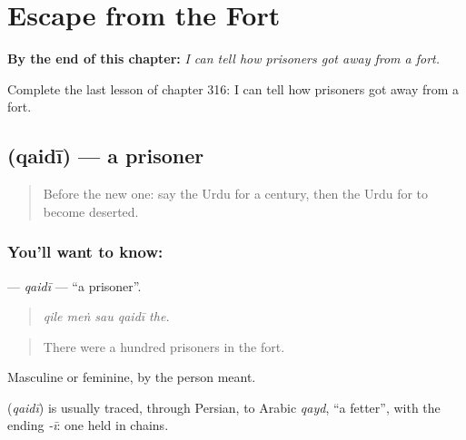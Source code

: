 
\chapter{Escape from the Fort}
\label{ch:ur-escape-from-the-fort}

\begin{chapteropening}
\textbf{By the end of this chapter:} \emph{I can tell how prisoners got away from a fort.}

Complete the last lesson of chapter 316: I can tell how prisoners got away from a fort.
\end{chapteropening}

\section[\texorpdfstring{\ur{قیدی} (qaidī)}{قیدی (qaidī)}]{ (qaidī) — a prisoner}

\label{lesson:UR-C316-qaidi}



\begin{quote}
Before the new one: say the Urdu for a century, then the Urdu for to become deserted.
\end{quote}

\subsection*{You'll want to know: }
\textbf{} — \emph{qaidī} — \textquotedblleft{}a prisoner\textquotedblright{}.

\begin{quote}
    
\end{quote}

\begin{quote}
\emph{qile meṅ sau qaidī the.}
\end{quote}

\begin{quote}
There were a hundred prisoners in the fort.
\end{quote}

Masculine or feminine, by the person meant.

\begin{cousinweb}
\textbf{} (\emph{qaidī}) is usually traced, through Persian, to Arabic \emph{qayd}, \textquotedblleft{}a fetter\textquotedblright{}, with the ending \emph{-ī}: one held in chains.
\end{cousinweb}

